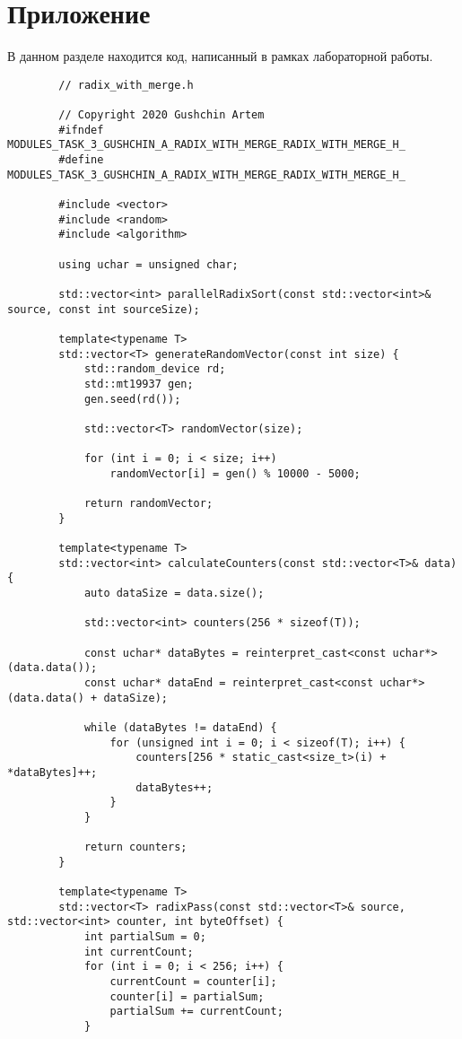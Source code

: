 \documentclass{report}
\begin{document}
	\section*{Приложение}
	В данном разделе находится код, написанный в рамках лабораторной работы.
	\begin{lstlisting}
		// radix_with_merge.h
		
		// Copyright 2020 Gushchin Artem
        #ifndef MODULES_TASK_3_GUSHCHIN_A_RADIX_WITH_MERGE_RADIX_WITH_MERGE_H_
        #define MODULES_TASK_3_GUSHCHIN_A_RADIX_WITH_MERGE_RADIX_WITH_MERGE_H_
        
        #include <vector>
        #include <random>
        #include <algorithm>
        
        using uchar = unsigned char;
        
        std::vector<int> parallelRadixSort(const std::vector<int>& source, const int sourceSize);
        
        template<typename T>
        std::vector<T> generateRandomVector(const int size) {
            std::random_device rd;
            std::mt19937 gen;
            gen.seed(rd());
        
            std::vector<T> randomVector(size);
        
            for (int i = 0; i < size; i++)
                randomVector[i] = gen() % 10000 - 5000;
        
            return randomVector;
        }
        
        template<typename T>
        std::vector<int> calculateCounters(const std::vector<T>& data) {
            auto dataSize = data.size();
        
            std::vector<int> counters(256 * sizeof(T));
        
            const uchar* dataBytes = reinterpret_cast<const uchar*>(data.data());
            const uchar* dataEnd = reinterpret_cast<const uchar*>(data.data() + dataSize);
        
            while (dataBytes != dataEnd) {
                for (unsigned int i = 0; i < sizeof(T); i++) {
                    counters[256 * static_cast<size_t>(i) + *dataBytes]++;
                    dataBytes++;
                }
            }
        
            return counters;
        }
        
        template<typename T>
        std::vector<T> radixPass(const std::vector<T>& source, std::vector<int> counter, int byteOffset) {
            int partialSum = 0;
            int currentCount;
            for (int i = 0; i < 256; i++) {
                currentCount = counter[i];
                counter[i] = partialSum;
                partialSum += currentCount;
            }
        

\end{lstlisting}
\end{document}
